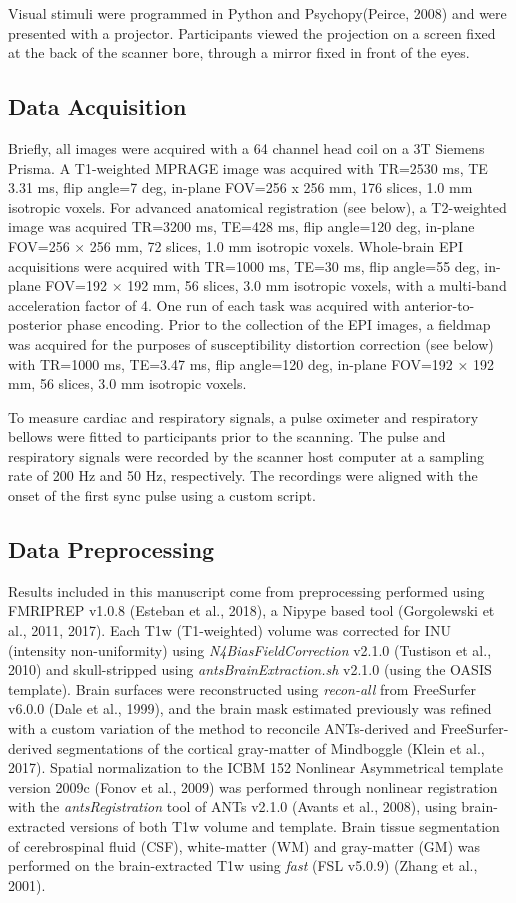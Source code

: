 \documentclass[9pt]{NEU502b-fmri}
\begin{document}
Visual stimuli were programmed in Python and Psychopy(Peirce, 2008) and were presented with a projector. Participants viewed the projection on a screen fixed at the back of the scanner bore, through a mirror fixed in front of the eyes.

\subsection{Data Acquisition}
Briefly, all images were acquired with a 64 channel head coil on a 3T Siemens Prisma. A T1-weighted MPRAGE image was acquired with TR=2530 ms,  TE 3.31 ms, flip angle=7 deg, in-plane FOV=256 x 256 mm, 176 slices, 1.0 mm isotropic voxels. For advanced anatomical registration (see below), a T2-weighted image was acquired TR=3200 ms, TE=428 ms, flip angle=120 deg, in-plane FOV=256 × 256 mm, 72 slices, 1.0 mm isotropic voxels. Whole-brain EPI acquisitions were acquired with TR=1000 ms, TE=30 ms, flip angle=55 deg, in-plane FOV=192 × 192 mm, 56 slices, 3.0 mm isotropic voxels, with a multi-band acceleration factor of 4. One run of each task was acquired with anterior-to-posterior phase encoding. Prior to the collection of the EPI images, a fieldmap was acquired for the purposes of susceptibility distortion correction (see below) with TR=1000 ms, TE=3.47 ms, flip angle=120 deg, in-plane FOV=192 × 192 mm, 56 slices, 3.0 mm isotropic voxels.

To measure cardiac and respiratory signals, a pulse oximeter and respiratory bellows were fitted to participants prior to the scanning. The pulse and respiratory signals were recorded by the scanner host computer at a sampling rate of 200 Hz and 50 Hz, respectively. The recordings were aligned with the onset of the first sync pulse using a custom script. 

\subsection{Data Preprocessing}

Results included in this manuscript come from preprocessing performed using FMRIPREP v1.0.8 (Esteban et al., 2018), a Nipype based tool (Gorgolewski et al., 2011, 2017). Each T1w (T1-weighted) volume was corrected for INU (intensity non-uniformity) using \textit{N4BiasFieldCorrection} v2.1.0  (Tustison et al., 2010) and skull-stripped using \textit{antsBrainExtraction.sh} v2.1.0 (using the OASIS template). Brain surfaces were reconstructed using \textit{recon-all} from FreeSurfer v6.0.0 (Dale et al., 1999), and the brain mask estimated previously was refined with a custom variation of the method to reconcile ANTs-derived and FreeSurfer-derived segmentations of the cortical gray-matter of Mindboggle (Klein et al., 2017). Spatial normalization to the ICBM 152 Nonlinear Asymmetrical template version 2009c (Fonov et al., 2009) was performed through nonlinear registration with the \textit{antsRegistration} tool of ANTs v2.1.0 (Avants et al., 2008), using brain-extracted versions of both T1w volume and template. Brain tissue segmentation of cerebrospinal fluid (CSF), white-matter (WM) and gray-matter (GM) was performed on the brain-extracted T1w using \textit{fast} (FSL v5.0.9) (Zhang et al., 2001).
\end{document}
